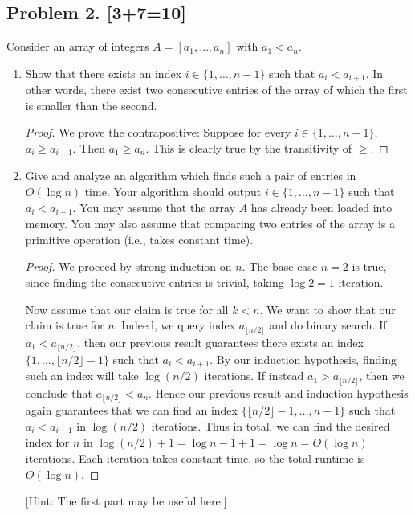 \documentclass[10pt]{article}
\begin{document}
\subsection*{Problem 2. [3+7=10]}

Consider an array of integers  $A=[a_1,\ldots, a_n]$ with $a_1 < a_n$. 

\begin{enumerate}
\item Show that there exists an index $i \in \{1,\ldots,n-1\}$ such that $a_i < a_{i+1}$. In other words, there exist two consecutive entries of the array of which the first is smaller than the second.

\begin{proof}
  We prove the contrapositive: Suppose for every \(i \in \{1, \ldots, n-1\}\), \(a_i \geq a_{i+1}\). Then \(a_1 \geq a_n\). This is clearly true by the transitivity of \(\geq\).
\end{proof}

\item Give and analyze an algorithm which finds such a pair of entries in $O(\log n)$ time. Your algorithm should output $i \in \{1,\ldots,n-1\}$ such that $a_i < a_{i+1}$. You may assume that the array $A$ has already been loaded into memory. You may also assume that comparing two entries of the array is a primitive operation (i.e., takes constant time).

\begin{proof}
  We proceed by strong induction on \(n\). The base case \(n = 2\) is true, since finding the consecutive entries is trivial, taking \(\log 2 = 1\) iteration. 

  Now assume that our claim is true for all \(k < n\). We want to show that our claim is true for \(n\). Indeed, we query index \(a_{\lfloor{n/2}\rfloor}\) and do binary search. If \(a_1 < a_{\lfloor{n/2}\rfloor}\), then our previous result guarantees there exists an index \(\{1, \ldots, \lfloor n/2\rfloor - 1\}\) such that \(a_i < a_{i + 1}\). By our induction hypothesis, finding such an index will take \(\log (n/2)\) iterations. If instead \(a_1 > a_{\lfloor{n/2}\rfloor}\), then we conclude that \(a_{\lfloor{n/2}\rfloor} < a_n\). Hence our previous result and induction hypothesis again guarantees that we can find an index \(\{\lfloor n/2\rfloor - 1, \ldots, n - 1\}\) such that \(a_i < a_{i + 1}\) in \(\log (n/2)\) iterations. Thus in total, we can find the desired index for \(n\) in \(\log (n/2) + 1 = \log n - 1 + 1 = \log n = O(\log n)\) iterations. Each iteration takes constant time, so the total runtime is \(O(\log n)\).
\end{proof}

  [Hint: The first part may be useful here.]
\end{enumerate}
\end{document}

